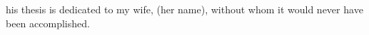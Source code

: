 \dedication

This thesis is dedicated to my wife, (her name), without whom it would never have been accomplished.